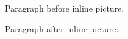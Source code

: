 \documentclass[11pt,a4paper]{article}
\begin{document}
Paragraph before inline picture.

\begin{figure}[h]
\end{figure}

Paragraph after inline picture.
\end{document}
